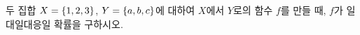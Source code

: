 두 집합 $X=\{1{,}\mkern3mu\mathopen{}2{,}\mkern3mu\mathopen{}3\}$, $Y=\{a{,}\mkern3mu\mathopen{}b{,}\mkern3mu\mathopen{}c\}$에 대하여 $X$에서 $Y$로의 함수 $f$를 만들 때, $f$가 일대일대응일 확률을 구하시오.
